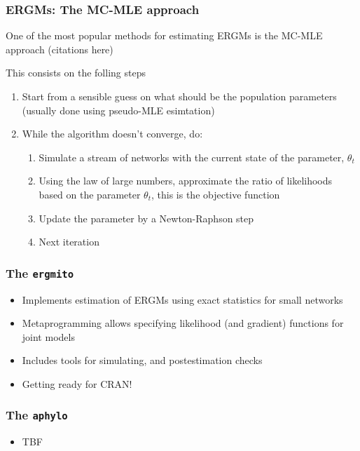 \documentclass[aspectratio=169, 10pt]{beamer}
\newcommand{\ergmitopkg}[0]{\texttt{ergmito}}
\newcommand{\aphylopkg}[0]{\texttt{aphylo}}
\begin{document}
\begin{frame}[label=mcmle]
\frametitle{ERGMs: The MC-MLE approach}

One of the most popular methods for estimating ERGMs is the MC-MLE approach (citations here)

This consists on the folling steps

\begin{enumerate}
\item Start from a sensible guess on what should be the population parameters
(usually done using pseudo-MLE esimtation)
\item While the algorithm doesn't converge, do:
  \begin{enumerate}
  \item Simulate a stream of networks with the current state of the parameter,
  $\theta_t$
  \item Using the law of large numbers, approximate the ratio of likelihoods 
  based on the parameter $\theta_t$, this is the objective function
  \item Update the parameter by a Newton-Raphson step
  \item Next iteration
  \end{enumerate}
\end{enumerate}

\hyperlink{art}{}


\end{frame}

\begin{frame}[label=ergmitopkg]
\frametitle{The \ergmitopkg{}}

\begin{itemize}
\item Implements estimation of ERGMs using exact statistics for small networks
\item Metaprogramming allows specifying likelihood (and gradient) functions for
joint models
\item Includes tools for simulating, and postestimation checks
\item Getting ready for CRAN!
\end{itemize}

\hyperlink{ergmito}{}

\end{frame}

\begin{frame}[label=aphylopkg]
\frametitle{The \aphylopkg{}}

\begin{itemize}
\item TBF
\end{itemize}

\hyperlink{aphylo}{}
\end{frame}
\end{document}
